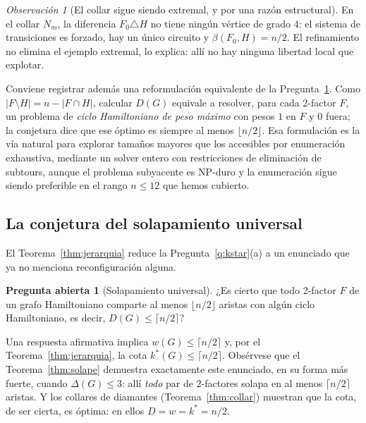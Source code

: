 \documentclass[11pt,a4paper]{article}
\theoremstyle{definition}
\newtheorem{pregunta}[teorema]{Pregunta abierta}
\theoremstyle{remark}
\newtheorem{observacion}[teorema]{Observación}
\begin{document}
\begin{observacion}[El collar sigue siendo extremal, y por una razón estructural]\label{obs:betacollar}
En el collar $N_m$, la diferencia $F_0\triangle H$ no tiene ningún vértice de grado $4$: el sistema de transiciones es forzado, hay un único circuito y $\beta(F_0,H)=n/2$. El refinamiento no elimina el ejemplo extremal, lo explica: allí no hay ninguna libertad local que explotar.
\end{observacion}

Conviene registrar además una reformulación equivalente de la Pregunta~\ref{conj:solape}. Como $|F\setminus H|=n-|F\cap H|$, calcular $D(G)$ equivale a resolver, para cada 2-factor $F$, un problema de \emph{ciclo Hamiltoniano de peso máximo} con pesos $1$ en $F$ y $0$ fuera; la conjetura dice que ese óptimo es siempre al menos $\lfloor n/2\rfloor$. Esa formulación es la vía natural para explorar tamaños mayores que los accesibles por enumeración exhaustiva, mediante un solver entero con restricciones de eliminación de subtours, aunque el problema subyacente es NP-duro y la enumeración sigue siendo preferible en el rango $n\le12$ que hemos cubierto.


\subsection{La conjetura del solapamiento universal}

El Teorema~\ref{thm:jerarquia} reduce la Pregunta~\ref{q:kstar}(a) a un enunciado que ya no menciona reconfiguración alguna.

\begin{pregunta}[Solapamiento universal]\label{conj:solape}
¿Es cierto que todo 2-factor $F$ de un grafo Hamiltoniano comparte al menos $\lfloor n/2\rfloor$ aristas con algún ciclo Hamiltoniano, es decir, $D(G)\le\lceil n/2\rceil$?
\end{pregunta}

Una respuesta afirmativa implica $w(G)\le\lceil n/2\rceil$ y, por el Teorema~\ref{thm:jerarquia}, la cota $k^*(G)\le\lceil n/2\rceil$. Obsérvese que el Teorema~\ref{thm:solape} demuestra exactamente este enunciado, en su forma más fuerte, cuando $\Delta(G)\le3$: allí \emph{todo} par de 2-factores solapa en al menos $\lceil n/2\rceil$ aristas. Y los collares de diamantes (Teorema~\ref{thm:collar}) muestran que la cota, de ser cierta, es óptima: en ellos $D=w=k^*=n/2$.
\end{document}
